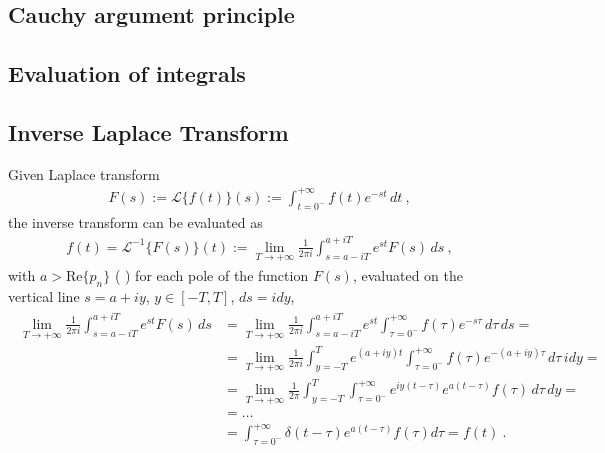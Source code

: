 \documentclass[letterpaper,10pt,english]{jupyterBook}
\begin{document}
\subsection{Cauchy argument principle}
\label{\detokenize{ch/complex/analysis:cauchy-argument-principle}}\label{\detokenize{ch/complex/analysis:complex-analysis-mero-fun-cauchy-argument-principle}}

\subsection{Evaluation of integrals}
\label{\detokenize{ch/complex/analysis:evaluation-of-integrals}}

\subsection{Inverse Laplace Transform}
\label{\detokenize{ch/complex/analysis:inverse-laplace-transform}}
\sphinxAtStartPar
Given Laplace transform
\begin{equation*}
\begin{split}F(s) := \mathscr{L}\{f(t)\}(s) := \int_{t=0^-}^{+\infty} f(t) e^{-st} \, dt \ ,\end{split}
\end{equation*}
\sphinxAtStartPar
the inverse transform can be evaluated as
\begin{equation*}
\begin{split}f(t) = \mathscr{L}^{-1}\{F(s)\}(t) := \lim_{T \rightarrow +\infty} \frac{1}{2 \pi i} \int_{s = a-iT}^{a+iT} e^{st} F(s) \, ds \ ,\end{split}
\end{equation*}
\sphinxAtStartPar
with \(a > \text{Re}\{p_n\}\) ( ) for each pole of the function \(F(s)\), evaluated on the vertical line \(s = a+iy\), \(y \in [-T,T]\), \(ds = i d y\),
\begin{equation*}
\begin{split}\begin{aligned}
  \lim_{T \rightarrow +\infty} \frac{1}{2 \pi i} \int_{s = a-iT}^{a+iT} e^{st} F(s) \, ds 
  & = \lim_{T \rightarrow +\infty} \frac{1}{2 \pi i} \int_{s = a-iT}^{a+iT} e^{st} \int_{\tau=0^-}^{+\infty} f(\tau) e^{-s\tau} \, d \tau  \, ds = \\
  & = \lim_{T \rightarrow +\infty} \frac{1}{2 \pi i} \int_{y = -T}^{T} e^{(a+iy)t} \int_{\tau=0^-}^{+\infty} f(\tau) e^{-(a+iy)\tau} \, d \tau  \, i dy = \\
  & = \lim_{T \rightarrow +\infty} \frac{1}{2 \pi} \int_{y = -T}^{T} \int_{\tau=0^-}^{+\infty} e^{iy(t-\tau)} e^{a(t-\tau)} f(\tau) \, d \tau  \, dy = \\
  & = \dots \\
  & = \int_{\tau=0^-}^{+\infty} \delta(t-\tau) e^{a(t-\tau)} f(\tau) d \tau = f(t) \ .
\end{aligned}\end{split}
\end{equation*}
\end{document}
